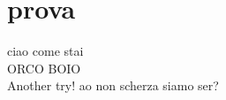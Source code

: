 \documentclass{article}
\begin{document}
    \section{prova}
        ciao come stai\\
        ORCO BOIO\\
        Another try! ao non scherza siamo ser?
\end{document}
